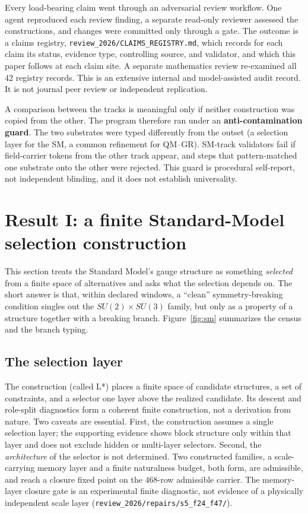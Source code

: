 \documentclass[11pt]{article}
\theoremstyle{definition}
\begin{document}
Every load-bearing claim went through an adversarial review workflow. One agent reproduced each review finding,
a separate read-only reviewer assessed the constructions, and changes were committed only through a gate. The outcome
is a claims registry, \nolinkurl{review_2026/CLAIMS_REGISTRY.md}, which records for each claim its status, evidence
type, controlling source, and validator, and which this paper follows at each claim site. A separate mathematics review
re-examined all \(42\) registry records. This is an extensive internal and model-assisted audit record. It is not
journal peer review or independent replication.

A comparison between the tracks is meaningful only if neither construction was copied from the other. The program
therefore ran under an \textbf{anti-contamination guard}. The two substrates were typed differently from the outset
(a selection layer for the SM, a common refinement for QM--GR). SM-track validators fail if field-carrier tokens from the
other track appear, and steps that pattern-matched one substrate onto the other were rejected. This guard is
procedural self-report, not independent blinding, and it does not establish universality.
 \section{Result I: a finite Standard-Model selection construction}\label{result-i-the-standard-model-as-a-selection-layer-a-demarcation}

This section treats the Standard Model's gauge structure as something \emph{selected} from a finite space of
alternatives and asks what the selection depends on. The short answer is that, within declared windows, a ``clean''
symmetry-breaking condition singles out the \(SU(2)\times SU(3)\) family, but only as a property of a structure
together with a breaking branch. Figure~\ref{fig:sm} summarizes the census and the branch typing.

\subsection{The selection layer}\label{the-problem-restated-structurally}

The construction (called L*) places a finite space of candidate structures, a set of constraints, and a selector one
layer above the realized candidate. Its descent and role-split diagnostics form a coherent finite construction, not
a derivation from nature. Two caveats are essential. First, the construction assumes a single selection layer; the
supporting evidence shows block structure only within that layer and does not exclude hidden or multi-layer selectors.
Second, the \emph{architecture} of the selector is not determined. Two constructed families, a scale-carrying memory
layer and a finite naturalness budget, both form, are admissible, and reach a closure fixed point on the \(468\)-row
admissible carrier. The memory-layer closure gate is an experimental finite diagnostic, not evidence of a physically
independent scale layer (\nolinkurl{review_2026/repairs/s5_f24_f47/}).
\end{document}
